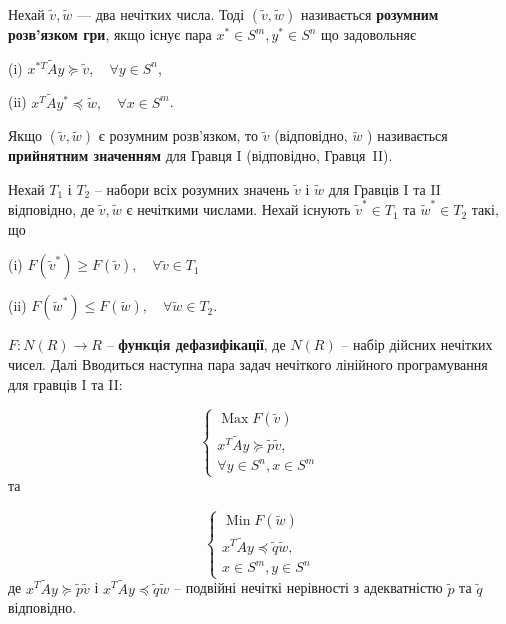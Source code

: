 \documentclass[14pt, a4paper, oneside]{extarticle}
\numberwithin{equation}{section}
\newcommand{\geqslant}{\geq}
\newcommand{\leqslant}{\leq}
\newcommand{\preccurlyeq}{\preceq}
\newcommand{\succcurlyeq}{\succeq}
\begin{document}
Нехай $\tilde{v}, \tilde{w}$ — два нечітких числа. Тоді $(\tilde{v}, \tilde{w})$ називається \textbf{розумним розв’язком гри}, якщо існує пара $x^{*} \in S^{m}, y^{*} \in S^{n}$ що задовольняє

(i) $x^{* T} \tilde{A} y \succcurlyeq \tilde{v}, \quad \forall y \in S^{n}$,

(ii) $x^{T} \tilde{A} y^{*} \preccurlyeq \tilde{w}, \quad \forall x \in S^{m}$.

Якщо $(\tilde{v}, \tilde{w})$ є розумним розв’язком, то $\tilde{v}$ (відповідно, $\tilde{w}$ ) називається \textbf{прийнятним значенням} для Гравця I (відповідно, Гравця~II).

Нехай $T_{1}$ і $T_{2}$ -- набори всіх розумних значень $\tilde{v}$ і $\tilde{w}$ для Гравців I та II відповідно, де $\tilde{v}, \tilde{w}$ є нечіткими числами. Нехай існують $\tilde{v}^{*} \in T_{1}$ та $\tilde{w}^{*} \in T_{2}$ такі, що

(i) $F\left(\tilde{v}^{*}\right) \geqslant F(\tilde{v}), \quad \forall \tilde{v} \in T_{1}$

(ii) $F\left(\tilde{w}^{*}\right) \leqslant F(\tilde{w}), \quad \forall \tilde{w} \in T_{2}$.

$F: N(R) \rightarrow R$ -- \textbf{функція дефазифікації}, де $N(R)$ -- набір дійсних нечітких чисел. Далі Вводиться наступна пара задач нечіткого лінійного програмування для гравців I та II:

\begin{equation}
\begin{cases}
\operatorname{Max} F(\tilde{v})\\
x^{T} \tilde{A} y \succcurlyeq \tilde{p} \tilde{v},\\ \forall y \in S^{n}, x \in S^{m}
\end{cases}
\end{equation}
та

\begin{equation}
\begin{cases}
\operatorname{Min} F(\tilde{w})\\
x^{T} \tilde{A} y \preccurlyeq \tilde{q} \tilde{w},\\ x \in S^{m}, y \in S^{n}
\end{cases}
\end{equation}
де $x^{T} \tilde{A} y \succcurlyeq \tilde{p} \tilde{v}$ і $x^{T} \tilde{A} y \preccurlyeq \tilde{q} \tilde{w }$
-- подвійні нечіткі нерівності з адекватністю $\tilde{p}$ та $\tilde{q}$ відповідно. 
\end{document}

